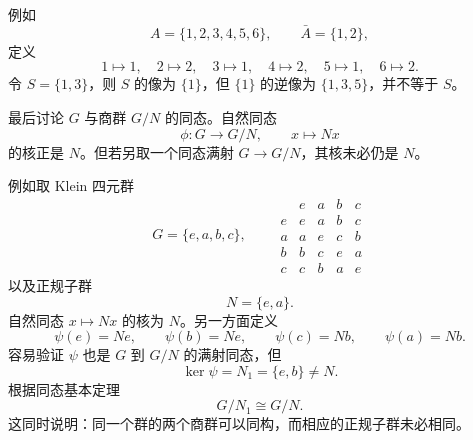 例如
\[
A=\{1,2,3,4,5,6\},\qquad \bar A=\{1,2\},
\]
定义
\[
1\mapsto1,\quad2\mapsto2,\quad3\mapsto1,
\quad4\mapsto2,\quad5\mapsto1,\quad6\mapsto2.
\]
令 $S=\{1,3\}$，则 $S$ 的像为 $\{1\}$，但 $\{1\}$ 的逆像为 $\{1,3,5\}$，并不等于 $S$。

最后讨论 $G$ 与商群 $G/N$ 的同态。自然同态
\[
\phi:G\to G/N,
\qquad
x\longmapsto Nx
\]
的核正是 $N$。但若另取一个同态满射 $G\to G/N$，其核未必仍是 $N$。

例如取 Klein 四元群
\[
G=\{e,a,b,c\},
\qquad
\begin{array}{c|cccc}
 &e&a&b&c\\\hline
 e&e&a&b&c\\
 a&a&e&c&b\\
 b&b&c&e&a\\
 c&c&b&a&e
\end{array}
\]
以及正规子群
\[
N=\{e,a\}.
\]
自然同态 $x\mapsto Nx$ 的核为 $N$。另一方面定义
\[
\psi(e)=Ne,
\qquad
\psi(b)=Ne,
\qquad
\psi(c)=Nb,
\qquad
\psi(a)=Nb.
\]
容易验证 $\psi$ 也是 $G$ 到 $G/N$ 的满射同态，但
\[
\ker\psi=N_1=\{e,b\}\ne N.
\]
根据同态基本定理
\[
G/N_1\cong G/N.
\]
这同时说明：同一个群的两个商群可以同构，而相应的正规子群未必相同。
